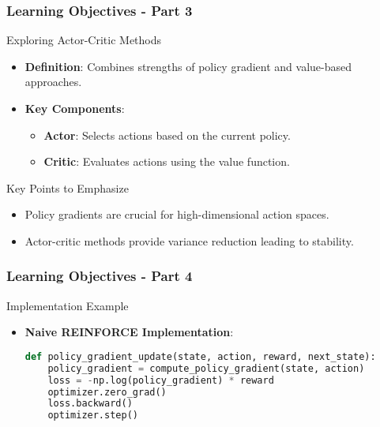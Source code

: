 \documentclass[aspectratio=169]{beamer}
\begin{document}
\begin{frame}[fragile]
    \frametitle{Learning Objectives - Part 3}
    \begin{block}{Exploring Actor-Critic Methods}
        \begin{itemize}
            \item \textbf{Definition}: Combines strengths of policy gradient and value-based approaches.
            \item \textbf{Key Components}:
            \begin{itemize}
                \item \textbf{Actor}: Selects actions based on the current policy.
                \item \textbf{Critic}: Evaluates actions using the value function.
            \end{itemize}
        \end{itemize}

        \begin{block}{Key Points to Emphasize}
            \begin{itemize}
                \item Policy gradients are crucial for high-dimensional action spaces.
                \item Actor-critic methods provide variance reduction leading to stability.
            \end{itemize}
        \end{block}
    \end{block}
\end{frame}

\begin{frame}[fragile]
    \frametitle{Learning Objectives - Part 4}
    \begin{block}{Implementation Example}
        \begin{itemize}
            \item \textbf{Naive REINFORCE Implementation}:
            \begin{lstlisting}[language=Python]
def policy_gradient_update(state, action, reward, next_state):
    policy_gradient = compute_policy_gradient(state, action)
    loss = -np.log(policy_gradient) * reward
    optimizer.zero_grad()
    loss.backward()
    optimizer.step()
            \end{lstlisting}
        \end{itemize}
    \end{block}
\end{frame}
\end{document}
